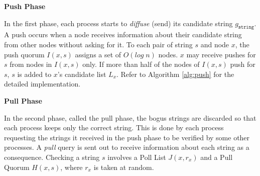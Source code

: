 \textbf{Push Phase}

 In the first phase, each process starts to \textit{diffuse} (send) its candidate string $g_{\mathtt{string}}$. A push occurs when a node receives information about their candidate string from other nodes without asking for it. To each pair of string $s$ and node $x$, the push quorum $I(x,s)$ assigns a set of $O(log\;n)$ nodes. $x$ may receive pushes for $s$ from nodes in $I(x,s)$ only. If more than half of the nodes of $I(x,s)$ push for $s$, $s$ is added to $x$'s candidate list $L_x$. Refer to Algorithm \ref{alg:push} for the detailed implementation.








\textbf{Pull Phase}

In the second phase, called the pull phase, the bogus strings are discarded so that each process keeps only the correct string. This is done by each process requesting the strings it received in the push phase to be verified by some other processes. A \textit{pull} query is sent out to receive information about each string as a consequence. Checking a string $s$ involves a Poll List $J(x, r_x)$ and a Pull Quorum $H(x, s)$, where $r_x$ is taken at random. 


